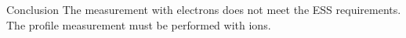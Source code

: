 \begin{frame}[t]
\begin{columns}[T]
\begin{column}{0.45\textwidth}
\begin{overlayarea}{\textwidth}{2cm}
      \end{overlayarea}
    \end{column}
  \end{columns}
  \begin{alertblock}{Conclusion}
    The measurement with electrons does not meet the ESS requirements.
    The profile measurement must be performed with ions.
  \end{alertblock}
\end{frame}

